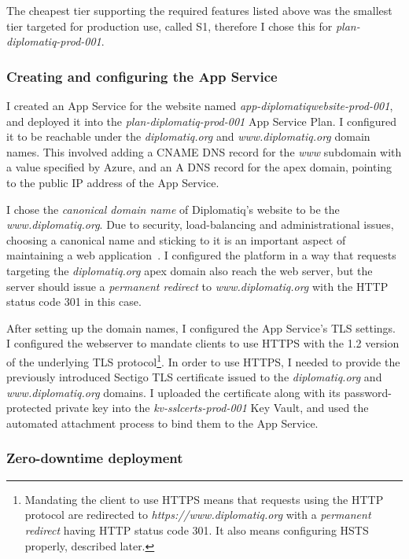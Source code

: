 The cheapest tier supporting the required features listed above was the smallest tier targeted for production use, called S1, therefore I chose this for \emph{plan-diplomatiq-prod-001}.

\subsubsection{Creating and configuring the App Service}

I created an App Service for the website named \emph{app-diplomatiqwebsite-prod-001}, and deployed it into the \emph{plan-diplomatiq-prod-001} App Service Plan. I configured it to be reachable under the \emph{diplomatiq.org} and \emph{www.diplomatiq.org} domain names. This involved adding a CNAME DNS record for the \emph{www} subdomain with a value specified by Azure, and an A DNS record for the apex domain, pointing to the public IP address of the App Service.

I chose the \emph{canonical domain name} of Diplomatiq's website to be the \emph{www.diplomatiq.org}. Due to security, load-balancing and administrational issues, choosing a canonical name and sticking to it is an important aspect of maintaining a web application~\cite{mdn-canonical-domain, bjorn-canonical-domain}. I configured the platform in a way that requests targeting the \emph{diplomatiq.org} apex domain also reach the web server, but the server should issue a \emph{permanent redirect} to \emph{www.diplomatiq.org} with the HTTP status code 301 in this case.

After setting up the domain names, I configured the App Service's TLS settings. I configured the webserver to mandate clients to use HTTPS with the 1.2 version of the underlying TLS protocol\footnote{Mandating the client to use HTTPS means that requests using the HTTP protocol are redirected to \emph{https://www.diplomatiq.org} with a \emph{permanent redirect} having HTTP status code 301. It also means configuring HSTS properly, described later.}. In order to use HTTPS, I needed to provide the previously introduced Sectigo TLS certificate issued to the \emph{diplomatiq.org} and \emph{www.diplomatiq.org} domains. I uploaded the certificate along with its password-protected private key into the \emph{kv-sslcerts-prod-001} Key Vault, and used the automated attachment process to bind them to the App Service.

\subsubsection{Zero-downtime deployment}

